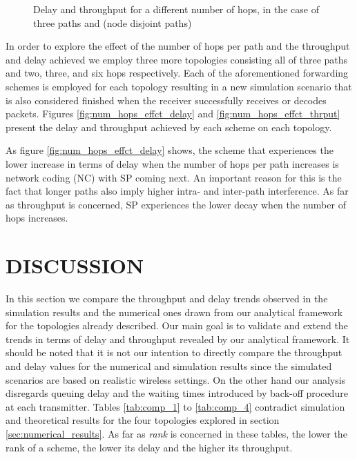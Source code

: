 \documentclass[journal, onecolumn, 12pt]{IEEEtran}
\begin{document}
\begin{figure}[ht]
\centering
{}
\label{fig:num_of_hops_eff}
\caption{Delay and throughput for a different number of hops, in the case of three paths and  (node disjoint paths)}
\end{figure}

In order to explore the effect of the number of hops per path and the throughput and delay achieved we employ three more topologies consisting all of three paths and two, three, and six hops respectively.
Each of the aforementioned forwarding schemes is employed for each topology resulting in a new simulation scenario that is also considered finished when the receiver successfully receives or decodes  packets.
Figures \ref{fig:num_hops_effct_delay} and \ref{fig:num_hops_effct_thrput} present the delay and throughput achieved by each scheme on each topology.

As figure \ref{fig:num_hops_effct_delay} shows, the scheme that experiences the lower increase in terms of delay when the number of hops per path increases is network
coding (NC) with SP coming next.
An important reason for this is the fact that longer paths also imply higher intra- and inter-path interference.
As far as throughput is concerned, SP experiences the lower decay when the number of hops increases.

\section{\uppercase{Discussion}}
\label{sec:discussion}

In this section we compare the throughput and delay trends observed in the simulation results and the numerical ones drawn from our analytical framework for the topologies already described.
Our main goal is to validate and extend the trends in terms of delay and throughput revealed by our analytical framework.
It should be noted that it is not our intention to directly compare the throughput and delay values for the numerical and simulation results since the simulated scenarios are based on realistic wireless settings.
On the other hand our analysis disregards queuing delay and the waiting times introduced by back-off procedure at each transmitter.
Tables \ref{tab:comp_1} to \ref{tab:comp_4} contradict simulation and theoretical results for the four topologies explored in section \ref{sec:numerical_results}.
As far as \textit{rank} is concerned in these tables, the lower the rank of a scheme, the lower its delay and the higher its throughput.
\end{document}
